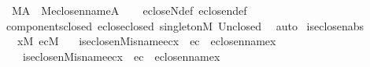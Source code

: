 \begin{isabellebody}
\ \ {\isachardoublequoteopen}{\isacharparenleft}{\kern0pt}{\isacharhash}{\kern0pt}{\isacharhash}{\kern0pt}M{\isacharparenright}{\kern0pt}{\isacharparenleft}{\kern0pt}A{\isacharparenright}{\kern0pt}\ {\isasymLongrightarrow}\ {\isacharparenleft}{\kern0pt}{\isacharhash}{\kern0pt}{\isacharhash}{\kern0pt}M{\isacharparenright}{\kern0pt}{\isacharparenleft}{\kern0pt}eclose{\isacharunderscore}{\kern0pt}n{\isacharparenleft}{\kern0pt}name{}{\isacharcomma}{\kern0pt}A{\isacharparenright}{\kern0pt}{\isacharparenright}{\kern0pt}{\isachardoublequoteclose}\isanewline
%
\isadelimproof
\ \ %
\endisadelimproof
%
\isatagproof
{}\isamarkupfalse%
\ ecloseN{\isacharunderscore}{\kern0pt}def\ eclose{\isacharunderscore}{\kern0pt}n{\isacharunderscore}{\kern0pt}def\isanewline
\ \ \isamarkupfalse%
\ components{\isacharunderscore}{\kern0pt}closed\ eclose{\isacharunderscore}{\kern0pt}closed\ singletonM\ Un{\isacharunderscore}{\kern0pt}closed\ \isamarkupfalse%
\ auto%
\endisatagproof
{\isafoldproof}%
%
\isadelimproof
\isanewline
%
\endisadelimproof
\isanewline
{}\isamarkupfalse%
\ is{\isacharunderscore}{\kern0pt}eclose{\isacharunderscore}{\kern0pt}n{\isacharunderscore}{\kern0pt}abs\ {\isacharcolon}{\kern0pt}\isanewline
\ \ \ {\isachardoublequoteopen}x{\isasymin}M{\isachardoublequoteclose}\ {\isachardoublequoteopen}ec{\isasymin}M{\isachardoublequoteclose}\isanewline
\ \ \ {\isachardoublequoteopen}is{\isacharunderscore}{\kern0pt}eclose{\isacharunderscore}{\kern0pt}n{\isacharparenleft}{\kern0pt}{\isacharhash}{\kern0pt}{\isacharhash}{\kern0pt}M{\isacharcomma}{\kern0pt}is{\isacharunderscore}{\kern0pt}name{}{\isacharcomma}{\kern0pt}ec{\isacharcomma}{\kern0pt}x{\isacharparenright}{\kern0pt}\ {\isasymlongleftrightarrow}\ ec\ {\isacharequal}{\kern0pt}\ eclose{\isacharunderscore}{\kern0pt}n{\isacharparenleft}{\kern0pt}name{}{\isacharcomma}{\kern0pt}x{\isacharparenright}{\kern0pt}{\isachardoublequoteclose}\isanewline
\ \ \ \ {\isachardoublequoteopen}is{\isacharunderscore}{\kern0pt}eclose{\isacharunderscore}{\kern0pt}n{\isacharparenleft}{\kern0pt}{\isacharhash}{\kern0pt}{\isacharhash}{\kern0pt}M{\isacharcomma}{\kern0pt}is{\isacharunderscore}{\kern0pt}name{}{\isacharcomma}{\kern0pt}ec{\isacharcomma}{\kern0pt}x{\isacharparenright}{\kern0pt}\ {\isasymlongleftrightarrow}\ ec\ {\isacharequal}{\kern0pt}\ eclose{\isacharunderscore}{\kern0pt}n{\isacharparenleft}{\kern0pt}name{}{\isacharcomma}{\kern0pt}x{\isacharparenright}{\kern0pt}{\isachardoublequoteclose}\isanewline

\end{isabellebody}
